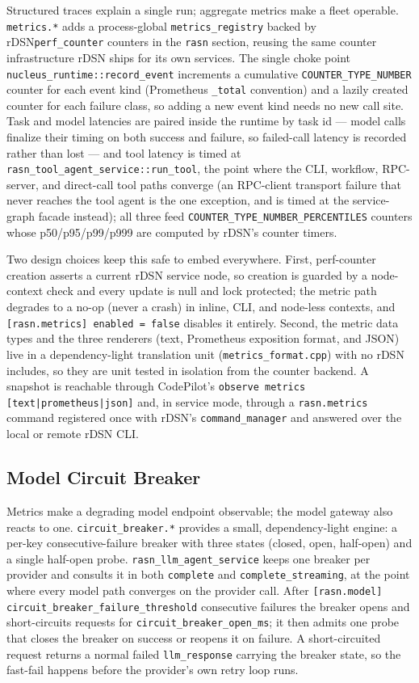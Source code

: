\documentclass[manuscript,screen,review]{acmart}
\newcommand{\rdsn}{rDSN\xspace}
\newcommand{\codepilot}{CodePilot\xspace}
\begin{document}
Structured traces explain a single run; aggregate metrics make a fleet
operable. \texttt{metrics.*} adds a process-global \texttt{metrics\_registry}
backed by \rdsn \texttt{perf\_counter} counters in the \texttt{rasn} section,
reusing the same counter infrastructure \rdsn ships for its own services. The
single choke point \texttt{nucleus\_runtime::record\_event} increments a
cumulative \texttt{COUNTER\_TYPE\_NUMBER} counter for each event kind (Prometheus
\texttt{\_total} convention) and a lazily created counter for each failure class,
so adding a new event kind needs no new call site. Task and model latencies are
paired inside the runtime by task id --- model calls finalize their timing on
both success and failure, so failed-call latency is recorded rather than lost ---
and tool latency is timed at \texttt{rasn\_tool\_agent\_service::run\_tool}, the
point where the CLI, workflow, RPC-server, and direct-call tool paths converge
(an RPC-client transport failure that never reaches the tool agent is the one
exception, and is timed at the service-graph facade instead);
all three feed \texttt{COUNTER\_TYPE\_NUMBER\_PERCENTILES} counters whose
p50/p95/p99/p999 are computed by \rdsn's counter timers.

Two design choices keep this safe to embed everywhere. First, perf-counter
creation asserts a current \rdsn service node, so creation is guarded by a
node-context check and every update is null and lock protected; the metric path
degrades to a no-op (never a crash) in inline, CLI, and node-less contexts, and
\texttt{[rasn.metrics] enabled = false} disables it entirely. Second, the metric
data types and the three renderers (text, Prometheus exposition format, and JSON)
live in a dependency-light translation unit (\texttt{metrics\_format.cpp}) with no
\rdsn includes, so they are unit tested in isolation from the counter backend. A
snapshot is reachable through \codepilot's \texttt{observe metrics
[text|prometheus|json]} and, in service mode, through a \texttt{rasn.metrics}
command registered once with \rdsn's \texttt{command\_manager} and answered over
the local or remote \rdsn CLI.

\subsection{Model Circuit Breaker}

Metrics make a degrading model endpoint observable; the model gateway also reacts
to one. \texttt{circuit\_breaker.*} provides a small, dependency-light engine: a
per-key consecutive-failure breaker with three states (closed, open, half-open)
and a single half-open probe. \texttt{rasn\_llm\_agent\_service} keeps one breaker
per provider and consults it in both \texttt{complete} and
\texttt{complete\_streaming}, at the point where every model path converges on the
provider call. After \texttt{[rasn.model] circuit\_breaker\_failure\_threshold}
consecutive failures the breaker opens and short-circuits requests for
\texttt{circuit\_breaker\_open\_ms}; it then admits one probe that closes the
breaker on success or reopens it on failure. A short-circuited request returns a
normal failed \texttt{llm\_response} carrying the breaker state, so the fast-fail
happens before the provider's own retry loop runs.
\end{document}
